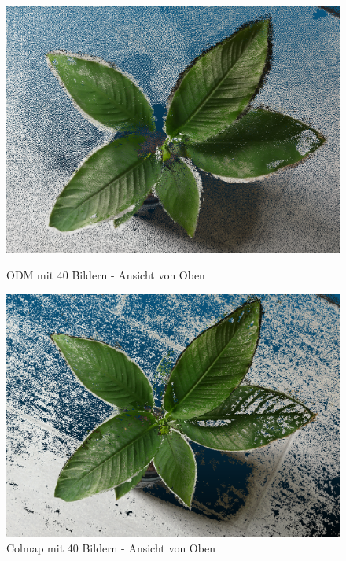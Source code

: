 \documentclass[12pt,titlepage, twoside]{article}
\begin{document}
\begin{figure}
    \centering
    \begin{minipage}{0.475\textwidth}
        \centering
        \includegraphics[width=1.0\textwidth]{./Images/ODMError.png}
        \caption{ODM mit 40 Bildern - Ansicht von Oben}
        \label{fig:ODMerror}
    \end{minipage}\hfill
    \begin{minipage}{0.475\textwidth}
        \centering
        \includegraphics[width=1.0\textwidth]{./Images/ColmapError.png}
        \caption{Colmap mit 40 Bildern - Ansicht von Oben}
        \label{fig:ColmapError}
    \end{minipage}
\end{figure}
\end{document}
